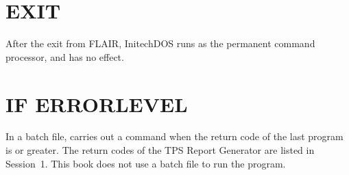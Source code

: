 \section{EXIT}
After the exit from FLAIR, InitechDOS runs as the permanent command
processor, and  has no effect.

\section{IF ERRORLEVEL}
In a batch file,   carries out a command when the
return code of the last program is  or greater.  The return codes of
the TPS Report Generator are listed in Session~1.  This book does not use a
batch file to run the program.
